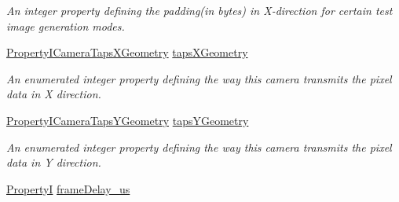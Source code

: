 \begin{DoxyCompactItemize}
\begin{DoxyCompactList}\small\item\em An integer property defining the padding(in bytes) in X-\/direction for certain test image generation modes. \end{DoxyCompactList}\item 
\hyperlink{group___device_specific_interface_gadb3acd27da51bc318c073aa7d052607b}{Property\+I\+Camera\+Taps\+X\+Geometry} \hyperlink{classmv_i_m_p_a_c_t_1_1acquire_1_1_camera_settings_virtual_device_a0bbf2c1250572ec75184d9a56fc12de2}{taps\+X\+Geometry}
\begin{DoxyCompactList}\small\item\em An enumerated integer property defining the way this camera transmits the pixel data in X direction. \end{DoxyCompactList}\item 
\hyperlink{group___device_specific_interface_ga8ca68a8fc0e8c81dacb76b2cfc289909}{Property\+I\+Camera\+Taps\+Y\+Geometry} \hyperlink{classmv_i_m_p_a_c_t_1_1acquire_1_1_camera_settings_virtual_device_af9547245a868b5fb47a0f8591b4b5408}{taps\+Y\+Geometry}
\begin{DoxyCompactList}\small\item\em An enumerated integer property defining the way this camera transmits the pixel data in Y direction. \end{DoxyCompactList}\item 
\hypertarget{classmv_i_m_p_a_c_t_1_1acquire_1_1_camera_settings_virtual_device_a2adc7091ec9b1537ff57011f25eb4f7a}{\hyperlink{group___common_interface_ga12d5e434238ca242a1ba4c6c3ea45780}{Property\+I} \hyperlink{classmv_i_m_p_a_c_t_1_1acquire_1_1_camera_settings_virtual_device_a2adc7091ec9b1537ff57011f25eb4f7a}{frame\+Delay\+\_\+us}}\label{classmv_i_m_p_a_c_t_1_1acquire_1_1_camera_settings_virtual_device_a2adc7091ec9b1537ff57011f25eb4f7a}


\end{DoxyCompactItemize}
